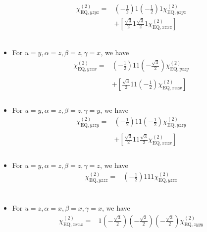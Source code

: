 \documentclass[UTF8,10pt,a4paper]{article}
\begin{document}
\begin{itemize}
\begin{align}
\nonumber\chi_{\text{EQ},yzyz}^{(2)}=&\left(-\frac{1}{2}\right)1\left(-\frac{1}{2}\right)1\chi_{\text{EQ},yzyz}^{(2)}\\
\nonumber&+\left[\frac{\sqrt{3}}{2}1\frac{\sqrt{3}}{2}1\chi_{\text{EQ},xzxz}^{(2)}\right]\\
\nonumber&\\
\nonumber&\\
&
\end{align}\normalsize
\item For $u=y,\alpha=z,\beta=z,\gamma=x$, we have
\footnotesize\begin{align}
\nonumber\chi_{\text{EQ},yzzx}^{(2)}=&\left(-\frac{1}{2}\right)11\left(-\frac{\sqrt{3}}{2}\right)\chi_{\text{EQ},yzzy}^{(2)}\\
\nonumber&\\
\nonumber&+\left[\frac{\sqrt{3}}{2}11\left(-\frac{1}{2}\right)\chi_{\text{EQ},xzzx}^{(2)}\right]\\
\nonumber&\\
&
\end{align}\normalsize
\item For $u=y,\alpha=z,\beta=z,\gamma=y$, we have
\footnotesize\begin{align}
\nonumber\chi_{\text{EQ},yzzy}^{(2)}=&\left(-\frac{1}{2}\right)11\left(-\frac{1}{2}\right)\chi_{\text{EQ},yzzy}^{(2)}\\
\nonumber&\\
\nonumber&+\left[\frac{\sqrt{3}}{2}11\frac{\sqrt{3}}{2}\chi_{\text{EQ},xzzx}^{(2)}\right]\\
\nonumber&\\
&
\end{align}\normalsize
\item For $u=y,\alpha=z,\beta=z,\gamma=z$, we have
\footnotesize\begin{align}
\nonumber\chi_{\text{EQ},yzzz}^{(2)}=&\left(-\frac{1}{2}\right)111\chi_{\text{EQ},yzzz}^{(2)}\\
\nonumber&\\
\nonumber&\\
\nonumber&\\
&
\end{align}\normalsize
\item For $u=z,\alpha=x,\beta=x,\gamma=x$, we have
\footnotesize\begin{align}
\nonumber\chi_{\text{EQ},zxxx}^{(2)}=&1\left(-\frac{\sqrt{3}}{2}\right)\left(-\frac{\sqrt{3}}{2}\right)\left(-\frac{\sqrt{3}}{2}\right)\chi_{\text{EQ},zyyy}^{(2)}\\

\end{align}
\end{itemize}
\end{document}
